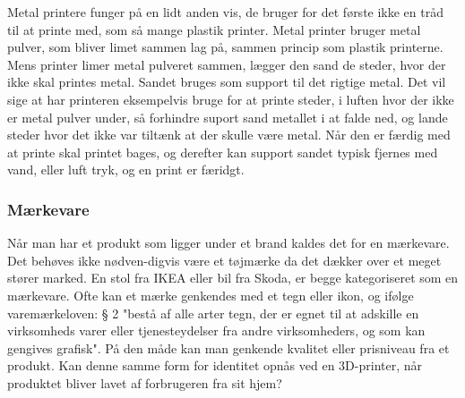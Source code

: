 Metal printere funger på en lidt anden vis, de bruger for det første ikke en tråd til at printe med, som så mange plastik printer. Metal printer bruger metal pulver, som bliver limet sammen lag på, sammen princip som plastik printerne. 
Mens printer limer metal pulveret sammen, lægger den sand de steder, hvor der ikke skal printes metal. Sandet bruges som support til det rigtige metal. Det vil sige at har printeren eksempelvis bruge for at printe steder, i luften hvor der ikke er metal pulver under, så forhindre suport sand metallet i at falde ned, og lande steder hvor det ikke var tiltænk at der skulle være metal.
Når den er færdig med at printe skal printet bages, og derefter kan support sandet typisk fjernes med vand, eller luft tryk, og en print er færidgt.

\subsubsection{Mærkevare}

Når man har et produkt som ligger under et brand kaldes det for en mærkevare. Det behøves ikke nødven-digvis være et tøjmærke da det dækker over et meget stører marked.  En stol fra IKEA eller bil fra Skoda, er begge kategoriseret som en mærkevare.  
Ofte kan et mærke genkendes med et tegn eller ikon, og ifølge varemærkeloven: § 2 "bestå af alle arter tegn, der er egnet til at adskille en virksomheds varer eller tjenesteydelser fra andre virksomheders, og som kan gengives grafisk". På den måde kan man genkende kvalitet eller prisniveau fra et produkt.
Kan denne samme form for identitet opnås ved en 3D-printer, når produktet bliver lavet af forbrugeren fra sit hjem?

